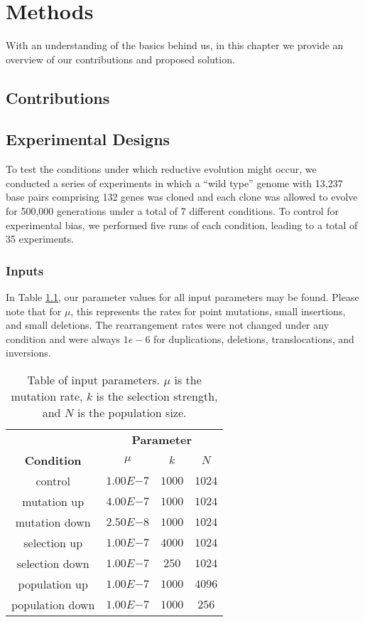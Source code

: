 \chapter{Methods}\label{ch:methods}
With an understanding of the basics behind us, in this chapter we provide an overview of our contributions and proposed solution.

\section{Contributions}

\section{Experimental Designs} \label{experimental_design}
To test the conditions under which reductive evolution might occur, we conducted a series of experiments in which a ``wild type'' genome with 13,237 base pairs comprising 132 genes was cloned and each clone was allowed to evolve for 500,000 generations under a total of 7 different conditions. To control for experimental bias, we performed five runs of each condition, leading to a total of 35 experiments. 

\subsection{Inputs}
In Table \ref{table:parameters}, our parameter values for all input parameters may be found. Please note that for $\mu$, this represents the rates for point mutations, small insertions, and small deletions. The rearrangement rates were not changed under any condition and were always $1e-6$ for duplications, deletions, translocations, and inversions. 

\begin{table}[h]
	\centering
	\begin{tabular}{|c||c|c|c|}
		\hline
		 & \multicolumn{3}{c|}{\textbf{Parameter}} \\
		\cline{2-4}
		\textbf{Condition} &$\mu$ & $k$ & $N$ \\
		\hline
		control & $1.00E{-7}$ & $1000$ & $1024$ \\
		\hline
		mutation up & $4.00E{-7}$ & $1000$ & $1024$ \\
		\hline
		mutation down & $2.50E{-8}$ & $1000$ & $1024$ \\
		\hline
		selection up & $1.00E{-7}$ & $4000$ & $1024$ \\
		\hline
		selection down & $1.00E{-7}$ & $250$ & $1024$ \\
		\hline
		population up & $1.00E{-7}$ & $1000$ & $4096$ \\
		\hline
		population down & $1.00E{-7}$ & $1000$ & $256$ \\		
		\hline
	\end{tabular}
	\caption[Table of parameters]{Table of input parameters. $\mu$ is the mutation rate, $k$ is the selection strength, and $N$ is the population size.}
	\label{table:parameters}
\end{table}

